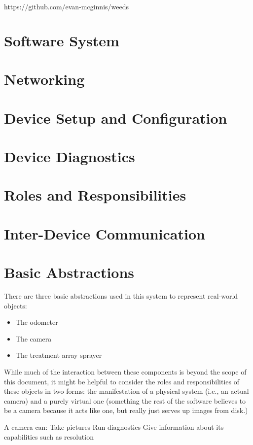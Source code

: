 \documentclass[letterpaper]{article}
\begin{document}
https://github.com/evan-mcginnis/weeds

\section{Software System}
\section{Networking}

\section{Device Setup and Configuration}

\section{Device Diagnostics}

\section{Roles and Responsibilities}

\section{Inter-Device Communication}

\section{Basic Abstractions}
There are three basic abstractions used in this system to represent real-world objects:
\begin{itemize}
	\item{The odometer}
	\item{The camera}
	\item{The treatment array sprayer}
\end{itemize}

While much of the interaction between these components is beyond the scope of this document, it might be helpful to consider the roles and responsibilities of these objects in two forms: the manifestation of a physical system (i.e., an actual camera) and a purely virtual one (something the rest of the software believes to be a camera because it acts like one, but really just serves up images from disk.)

A camera can:
Take pictures
Run diagnostics
Give information about its capabilities such as resolution
\end{document}
